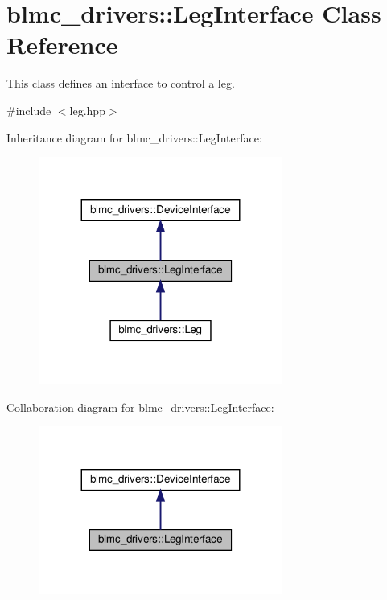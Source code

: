 \hypertarget{classblmc__drivers_1_1LegInterface}{}\section{blmc\+\_\+drivers\+:\+:Leg\+Interface Class Reference}
\label{classblmc__drivers_1_1LegInterface}


This class defines an interface to control a leg.  




{\ttfamily \#include $<$leg.\+hpp$>$}



Inheritance diagram for blmc\+\_\+drivers\+:\+:Leg\+Interface\+:
\nopagebreak
\begin{figure}[H]
\begin{center}
\leavevmode
\includegraphics[width=227pt]{classblmc__drivers_1_1LegInterface__inherit__graph}
\end{center}
\end{figure}


Collaboration diagram for blmc\+\_\+drivers\+:\+:Leg\+Interface\+:
\nopagebreak
\begin{figure}[H]
\begin{center}
\leavevmode
\includegraphics[width=227pt]{classblmc__drivers_1_1LegInterface__coll__graph}
\end{center}
\end{figure}
